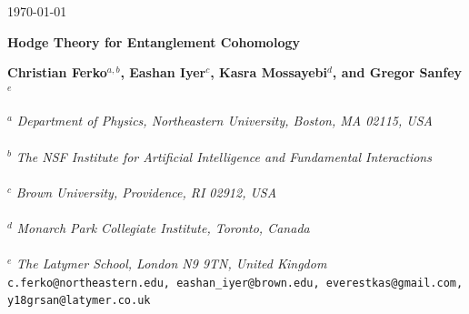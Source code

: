 \documentclass[12pt]{article}
\numberwithin{equation}{section}
\begin{document}
\begin{titlepage}
\begin{flushright}
\today
\end{flushright}
\vspace{5mm}

\begin{center}
{\Large \bf 
Hodge Theory for Entanglement Cohomology
}
\end{center}

\begin{center}

{\bf
Christian Ferko${}^{a,b}$,
Eashan Iyer${}^c$, 
Kasra Mossayebi${}^{d}$,
and
Gregor Sanfey${}^{e}$
} \\
\vspace{5mm}

\footnotesize{
${}^{a}$
{\it 
Department of Physics, Northeastern University, Boston, MA 02115, USA
}
 \\~\\
${}^{b}$
{\it 
The NSF Institute for Artificial Intelligence
and Fundamental Interactions
}
 \\~\\
 ${}^{c}$
{\it 
Brown University, Providence, RI 02912, USA
}
 \\~\\
${}^{d}$
{\it 
Monarch Park Collegiate Institute, Toronto, Canada}
}
 \\~\\
${}^{e}$
{\it 
The Latymer School, London N9 9TN, United Kingdom
}
\vspace{3mm}
~\\
\texttt{c.ferko@northeastern.edu, 
eashan\_iyer@brown.edu, 
everestkas@gmail.com,
y18grsan@latymer.co.uk
}\\
\vspace{3mm}


\end{center}

\begin{abstract}
\baselineskip=14pt

\noindent We explore and extend the application of homological algebra to describe quantum entanglement, initiated in \cite{Mainiero:2019enr}, focusing on the Hodge-theoretic structure of entanglement cohomology in finite-dimensional quantum systems. We construct analogues of the Hodge star operator, inner product, codifferential, and Laplacian for entanglement $k$-forms. We also prove that such $k$-forms obey versions of the Hodge isomorphism theorem and Hodge decomposition, and that they exhibit Hodge duality. As a corollary, we conclude that the dimensions of the $k$-th and $(n-k)$-th cohomologies coincide for entanglement in $n$-partite pure states, which explains a symmetry property (``Poincar\'e duality'') of the associated Poincar\'e polynomials.


\end{abstract}
\vspace{5mm}




\vfill
\end{titlepage}
\end{document}
